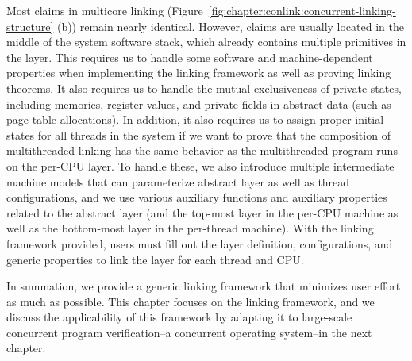 Most claims in multicore linking (Figure~\ref{fig:chapter:conlink:concurrent-linking-structure} (b)) 
remain nearly identical. However, claims are usually located in the middle of the system software stack, which already contains multiple primitives in the layer. 
This requires us to handle some software and machine-dependent properties when implementing the linking framework as well as proving linking theorems. It also requires us to handle the mutual exclusiveness of private states, including memories, register values, and private fields in abstract data (such as page table allocations). 
In addition, it also requires us to assign proper initial states for all threads in the system if we want to prove that the composition of multithreaded linking has the same behavior as the multithreaded program runs on the 
per-CPU layer. 
To handle these, we also introduce multiple intermediate machine models that can parameterize abstract layer as well as thread configurations, 
and we use various auxiliary functions and auxiliary properties related to the abstract layer (and the top-most layer in the per-CPU machine as well as the bottom-most layer in the per-thread  machine). 
With the linking framework provided, users must fill out the layer definition, configurations, and generic properties to link the layer for each thread and CPU.


In summation, we provide a generic linking framework that minimizes user effort as much as possible. This chapter focuses on the linking framework, and we discuss the applicability of this framework by adapting it to large-scale concurrent program verification--a concurrent operating system--in the next chapter.



